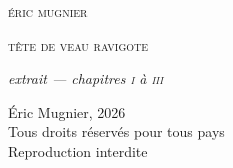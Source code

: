 \documentclass[12pt,twoside,openright]{memoir}
\makeatletter
\renewcommand{\cleardoublepage}{%
  \clearpage
  \if@twoside
    \ifodd\c@page\else
      \hbox{}\thispagestyle{empty}\newpage
    \fi
  \fi
}
\makeatother
\begin{document}
\pagestyle{empty}

\begin{center}
\vspace*{6\onelineskip}
{\scshape\large éric mugnier}

\vspace{8\onelineskip}
{\scshape\huge tête de veau ravigote}

\vspace{2\onelineskip}
{\itshape extrait — chapitres \textsc{i} à \textsc{iii}}

\end{center}
\newpage
\thispagestyle{empty}
\vspace*{\fill}
{\footnotesize\noindent
\textcopyright{} Éric Mugnier, 2026\\
Tous droits réservés pour tous pays\\
Reproduction interdite
}
\cleardoublepage

\pagestyle{gallimard}
{\makeatletter\def\contentsline#1#2#3#4{}\makeatother}





\end{document}
